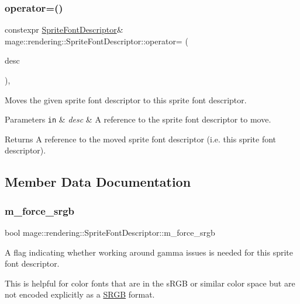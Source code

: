 \subsubsection{\texorpdfstring{operator=()}{operator=()}\hspace{0.1cm}{\footnotesize\ttfamily [2/2]}}
{\footnotesize\ttfamily constexpr \hyperlink{classmage_1_1rendering_1_1_sprite_font_descriptor}{Sprite\+Font\+Descriptor}\& mage\+::rendering\+::\+Sprite\+Font\+Descriptor\+::operator= (\begin{DoxyParamCaption}\item[{\hyperlink{classmage_1_1rendering_1_1_sprite_font_descriptor}{Sprite\+Font\+Descriptor} \&\&}]{desc }\end{DoxyParamCaption})\hspace{0.3cm}{\ttfamily [default]}, {\ttfamily [noexcept]}}

Moves the given sprite font descriptor to this sprite font descriptor.


\begin{DoxyParams}[1]{Parameters}
\mbox{\tt in}  & {\em desc} & A reference to the sprite font descriptor to move. \\
\hline
\end{DoxyParams}
\begin{DoxyReturn}{Returns}
A reference to the moved sprite font descriptor (i.\+e. this sprite font descriptor). 
\end{DoxyReturn}


\subsection{Member Data Documentation}
\hypertarget{classmage_1_1rendering_1_1_sprite_font_descriptor_abfb5c7d28df254c483c489be55736c76}{}\label{classmage_1_1rendering_1_1_sprite_font_descriptor_abfb5c7d28df254c483c489be55736c76} 
\subsubsection{\texorpdfstring{m\+\_\+force\+\_\+srgb}{m\_force\_srgb}}
{\footnotesize\ttfamily bool mage\+::rendering\+::\+Sprite\+Font\+Descriptor\+::m\+\_\+force\+\_\+srgb\hspace{0.3cm}{\ttfamily [private]}}

A flag indicating whether working around gamma issues is needed for this sprite font descriptor.

This is helpful for color fonts that are in the s\+R\+GB or similar color space but are not encoded explicitly as a \hyperlink{structmage_1_1_s_r_g_b}{S\+R\+GB} format. 